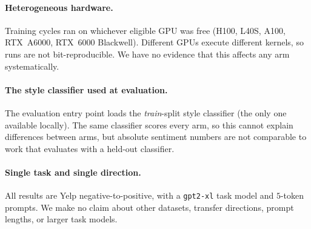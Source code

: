 \paragraph{Heterogeneous hardware.}
Training cycles ran on whichever eligible GPU was free (H100, L40S, A100,
RTX~A6000, RTX~6000 Blackwell). Different GPUs execute different kernels, so
runs are not bit-reproducible. We have no evidence that this affects any arm
systematically.

\paragraph{The style classifier used at evaluation.}
The evaluation entry point loads the \emph{train}-split style classifier (the
only one available locally). The same classifier scores every arm, so this
cannot explain differences between arms, but absolute sentiment numbers are not
comparable to work that evaluates with a held-out classifier.

\paragraph{Single task and single direction.}
All results are Yelp negative-to-positive, with a \texttt{gpt2-xl} task model and
$5$-token prompts. We make no claim about other datasets, transfer directions,
prompt lengths, or larger task models.
